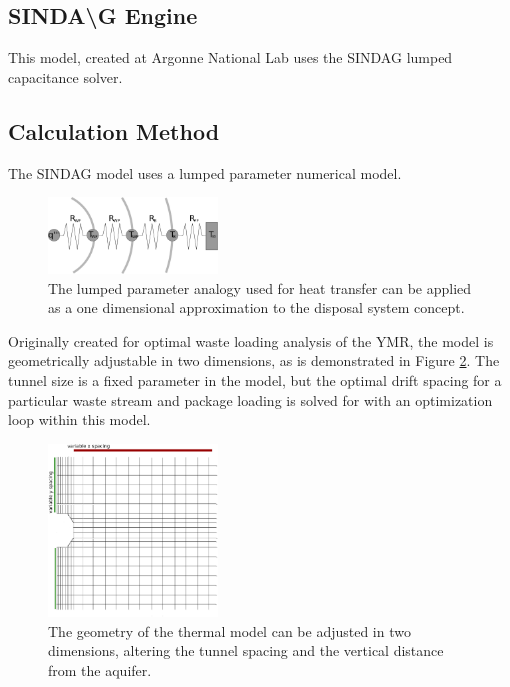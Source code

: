 \documentclass{anstrans}
\begin{document}
\subsection{SINDA{\textbackslash}G Engine}

This model, created at Argonne National Lab  uses the \gls{SINDAG} lumped 
capacitance solver.  

\subsection{Calculation Method}

The \gls{SINDAG} model uses a lumped parameter numerical model.

\begin{figure}[h!]
  \begin{center}
    \includegraphics[width=0.4\textwidth]{lumpedParam.eps}
  \end{center}
  \caption{The lumped parameter analogy used for heat transfer can be applied as 
  a one dimensional approximation to the disposal system concept. }
  \label{fig:lumpedParam}
\end{figure}

Originally created for optimal waste loading analysis of the \gls{YMR}, the 
model is geometrically adjustable in two dimensions,  as is demonstrated in 
Figure \ref{fig:sindageom}. The tunnel size is a fixed parameter in the model, 
but the optimal drift spacing for a particular waste stream and package loading 
is solved for with an optimization loop within this model.

\begin{figure}[htbp!]
  \begin{center}
    \includegraphics[width=0.4\textwidth]{./sindageom.eps}
  \end{center}
  \caption{The geometry of the thermal model can be adjusted in two dimensions, 
  altering the tunnel spacing and the vertical distance from the aquifer.}
  \label{fig:sindageom}
\end{figure}
\end{document}
